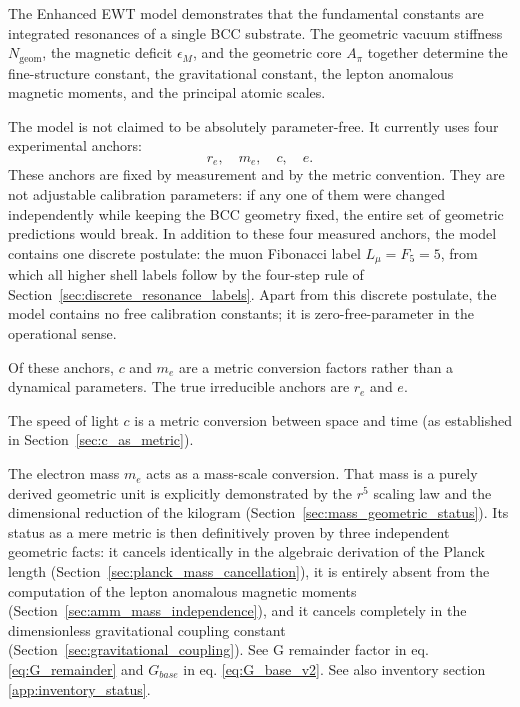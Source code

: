 \documentclass[10pt,a4paper]{article}
\begin{document}
The Enhanced EWT model demonstrates that the fundamental constants are
integrated resonances of a single BCC substrate. The geometric vacuum
stiffness \(N_{\text{geom}}\), the magnetic deficit \(\epsilon_M\), and the
geometric core \(A_\pi\) together determine the fine-structure constant,
the gravitational constant, the lepton anomalous magnetic moments, and the
principal atomic scales.

The model is not claimed to be absolutely parameter-free. It currently uses four experimental anchors:
\begin{equation}
	r_e,\quad m_e,\quad c,\quad e.
\end{equation}
These anchors are fixed by measurement and by the metric convention. They are not adjustable calibration parameters: if any one of them were changed independently while keeping the BCC geometry fixed, the entire set of geometric predictions would break. In addition to these four measured anchors, the model contains one discrete postulate: the muon Fibonacci label $L_\mu = F_5 = 5$, from which all higher shell labels follow by the four-step rule of Section~\ref{sec:discrete_resonance_labels}. Apart from this discrete postulate, the model contains no free calibration constants; it is zero-free-parameter in the operational sense.

Of these anchors, \(c\) and \(m_e\) are a metric conversion factors rather than a dynamical parameters.  The true irreducible anchors are \(r_e\) and \(e\). 

The speed of light \(c\) is a metric conversion between space and time (as established in Section~\ref{sec:c_as_metric}).

The electron mass \(m_e\) acts as a mass-scale conversion. That mass is a purely derived geometric unit is explicitly demonstrated by the \(r^5\) scaling law and the dimensional reduction of the kilogram (Section~\ref{sec:mass_geometric_status}). Its status as a mere metric is then definitively proven by three independent geometric facts: it cancels identically in the algebraic derivation of the Planck length (Section~\ref{sec:planck_mass_cancellation}), it is entirely absent from the computation of the lepton anomalous magnetic moments (Section~\ref{sec:amm_mass_independence}), and it cancels completely in the dimensionless gravitational coupling constant (Section~\ref{sec:gravitational_coupling}). See G remainder factor in eq. \ref{eq:G_remainder} and $G_{base}$ in eq. \ref{eq:G_base_v2}. 
See also inventory section \ref{app:inventory_status}. 
\end{document}
